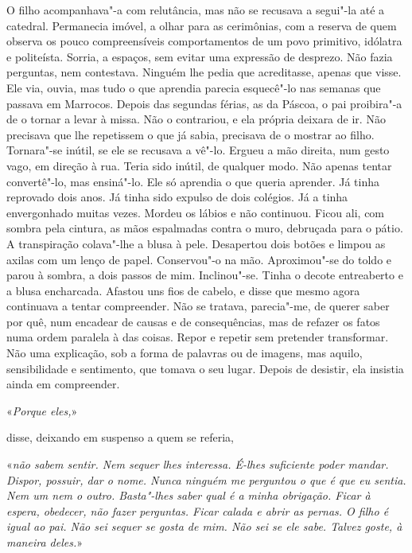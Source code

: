 O filho acompanhava"-a com relutância, mas não se recusava a segui"-la
até a catedral. Permanecia imóvel, a olhar para as cerimônias, com a
reserva de quem observa os pouco compreensíveis comportamentos de um
povo primitivo, idólatra e politeísta. Sorria, a espaços, sem evitar uma
expressão de desprezo. Não fazia perguntas, nem contestava. Ninguém lhe
pedia que acreditasse, apenas que visse. Ele via, ouvia, mas tudo o que
aprendia parecia esquecê"-lo nas semanas que passava em Marrocos. Depois
das segundas férias, as da Páscoa, o pai proibira"-a de o tornar a levar
à missa. Não o contrariou, e ela própria deixara de ir. Não precisava
que lhe repetissem o que já sabia, precisava de o mostrar ao filho.
Tornara"-se inútil, se ele se recusava a vê"-lo. Ergueu a mão direita,
num gesto vago, em direção à rua. Teria sido inútil, de qualquer modo.
Não apenas tentar convertê"-lo, mas ensiná"-lo. Ele só aprendia o que
queria aprender. Já tinha reprovado dois anos. Já tinha sido expulso de
dois colégios. Já a tinha envergonhado muitas vezes. Mordeu os lábios e
não continuou. Ficou ali, com sombra pela cintura, as mãos espalmadas
contra o muro, debruçada para o pátio. A transpiração colava"-lhe a
blusa à pele. Desapertou dois botões e limpou as axilas com um lenço de
papel. Conservou"-o na mão. Aproximou"-se do toldo e parou à sombra, a
dois passos de mim. Inclinou"-se. Tinha o decote entreaberto e a blusa
encharcada. Afastou uns fios de cabelo, e disse que mesmo agora
continuava a tentar compreender. Não se tratava, parecia"-me, de querer
saber por quê, num encadear de causas e de consequências, mas de refazer
os fatos numa ordem paralela à das coisas. Repor e repetir sem
pretender transformar. Não uma explicação, sob a forma de palavras ou de
imagens, mas aquilo, sensibilidade e sentimento, que tomava o seu lugar.
Depois de desistir, ela insistia ainda em compreender.

«\emph{Porque eles,}»

disse, deixando em suspenso a quem se referia,

«\emph{não sabem sentir. Nem sequer lhes interessa. É-lhes suficiente
poder mandar. Dispor, possuir, dar o nome. Nunca ninguém me perguntou o
que é que eu sentia. Nem um nem o outro. Basta"-lhes saber qual é a
minha obrigação. Ficar à espera, obedecer, não fazer perguntas. Ficar
calada e abrir as pernas. O filho é igual ao pai. Não sei sequer se
gosta de mim. Não sei se ele sabe. Talvez goste, à maneira deles.}»

